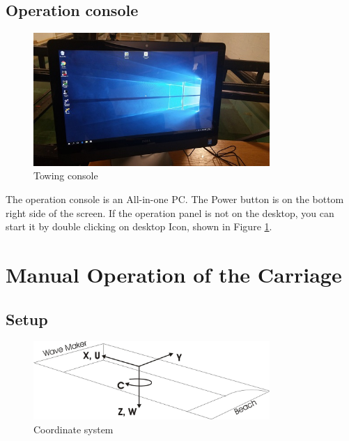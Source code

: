 \documentclass[a4paper,twoside,english]{report}
\begin{document}
\subsection{Operation console}

\begin{figure}
\centering \includegraphics[width=0.8\textwidth]{fig/towing_console}
\caption{\label{fig: Towing console}Towing console}
\end{figure}

The operation console is an All-in-one PC. The Power button is on
the bottom right side of the screen. If the operation panel is not
on the desktop, you can start it by double clicking on desktop Icon,
shown in Figure \ref{fig: Towing console}.

\newpage{}

\section{Manual Operation of the Carriage}

\subsection{Setup}

\begin{figure}
\centering \includegraphics[width=0.8\textwidth]{fig/towing_coordinate_sketch}
\caption{\label{fig: Towing carriage-1}Coordinate system}
\end{figure}
\end{document}
